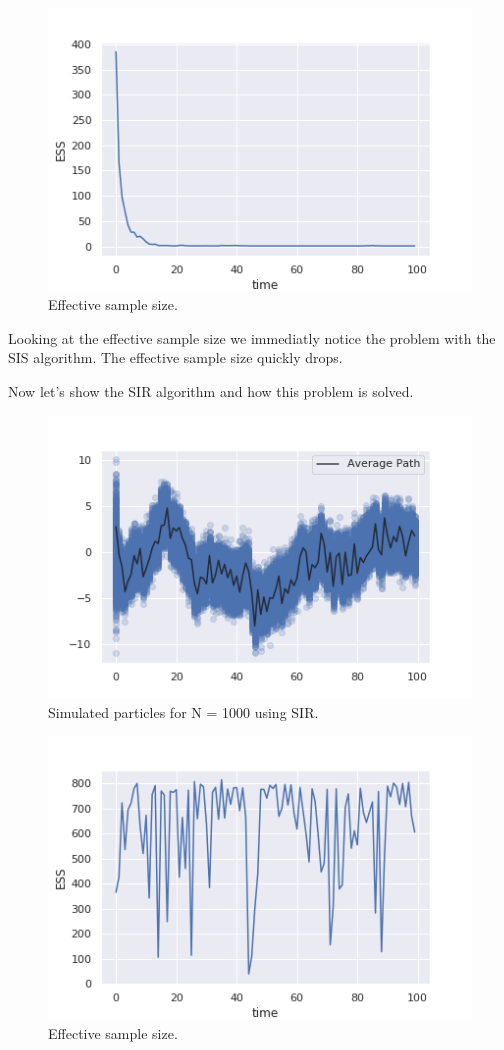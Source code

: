\documentclass[12pt,letterpaper]{article}
\begin{document}
    \begin{figure}[H]
        \centering
        \includegraphics[width=12cm]{images/ESS_SIS.png}
        \caption{Effective sample size.}
    \end{figure}
    Looking at the effective sample size we immediatly notice
    the problem with the SIS algorithm. The effective sample size
    quickly drops.

    Now let's show the SIR algorithm and how this problem is solved.
    \begin{figure}[H]
        \centering
        \includegraphics[width=12cm]{images/SIR_Paths.png}
        \caption{Simulated particles for N = 1000 using SIR.}
    \end{figure}

    \begin{figure}[H]
        \centering
        \includegraphics[width=12cm]{images/ESS_SIR.png}
        \caption{Effective sample size.}
    \end{figure}
\end{document}
